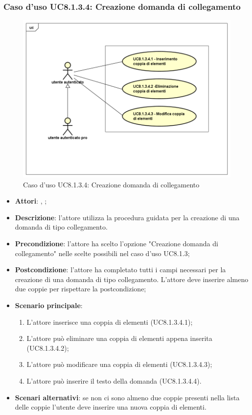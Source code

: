 \subsubsection{Caso d'uso UC8.1.3.4: Creazione domanda di collegamento}
\label{UC8.1.3.4}
\begin{figure}[h]
	\centering
\includegraphics[scale=0.5,keepaspectratio]{UML/UC8_1_3_4.png}
	\caption{Caso d'uso UC8.1.3.4: Creazione domanda di collegamento}
\end{figure}
\FloatBarrier
\begin{itemize}
	\item \textbf{Attori}: \uau, \uaupro;
	\item \textbf{Descrizione}: l'attore utilizza la procedura guidata per la creazione di una domanda di tipo collegamento. 
	\item \textbf{Precondizione}: l'attore ha scelto l'opzione "Creazione domanda di collegamento" nelle scelte possibili nel caso d'uso UC8.1.3;
	\item \textbf{Postcondizione}: l'attore ha completato tutti i campi necessari per la creazione di una domanda di tipo collegamento. L'attore deve inserire almeno due coppie per rispettare la postcondizione;
	\item \textbf{Scenario principale}: 
		\begin{enumerate}
			\item L'attore inserisce una coppia di elementi (UC8.1.3.4.1);
			\item L'attore può eliminare una coppia di elementi appena inserita (UC8.1.3.4.2);
			\item L'attore può modificare una coppia di elementi (UC8.1.3.4.3);
			\item L'attore può inserire il testo della domanda (UC8.1.3.4.4).
		\end{enumerate}
	\item \textbf{Scenari alternativi}: se non ci sono almeno due coppie presenti nella lista delle coppie l'utente deve inserire una nuova coppia di elementi.
\end{itemize}

